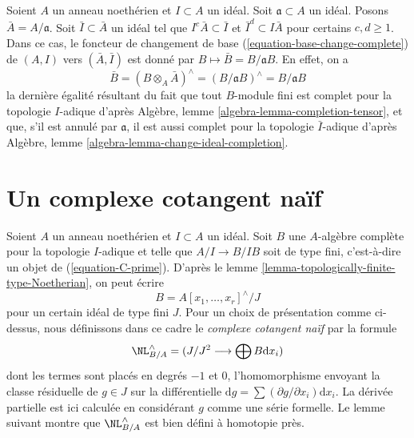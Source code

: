 \begin{remark}
\label{remark-take-bar}
Soient $A$ un anneau noethérien et $I \subset A$ un idéal. Soit
$\mathfrak a \subset A$ un idéal. Posons $\bar A = A/\mathfrak a$. Soit
$\bar I \subset \bar A$ un idéal tel que $I^c \bar A \subset \bar I$ et
$\bar I^d \subset I\bar A$ pour certains $c, d \geq 1$. Dans ce cas, le
foncteur de changement de base (\ref{equation-base-change-complete}) de
$(A, I)$ vers $(\bar A, \bar I)$ est donné par
$B \mapsto \bar B = B/\mathfrak aB$. En effet, on a
\begin{equation}
\label{equation-base-change-to-closed}
\bar B = (B \otimes_A \bar A)^\wedge = (B/\mathfrak a B)^\wedge =
B/\mathfrak a B
\end{equation}
la dernière égalité résultant du fait que tout $B$-module fini est complet
pour la topologie $I$-adique d'après Algèbre, lemme
\ref{algebra-lemma-completion-tensor}, et que, s'il est annulé par
$\mathfrak a$, il est aussi complet pour la topologie $\bar I$-adique d'après
Algèbre, lemme \ref{algebra-lemma-change-ideal-completion}.
\end{remark}







\section{Un complexe cotangent naïf}
\label{section-naive-cotangent-complex}

\noindent
Soient $A$ un anneau noethérien et $I \subset A$ un idéal. Soit $B$ une
$A$-algèbre complète pour la topologie $I$-adique et telle que
$A/I \to B/IB$ soit de type fini, c'est-à-dire un objet de
(\ref{equation-C-prime}). D'après le lemme
\ref{lemma-topologically-finite-type-Noetherian}, on peut écrire
$$
B = A[x_1, \ldots, x_r]^\wedge / J
$$
pour un certain idéal de type fini $J$. Pour un choix de présentation comme
ci-dessus, nous définissons dans ce cadre le {\it complexe cotangent naïf} par
la formule
\begin{equation}
\label{equation-NL}
\NL_{B/A}^\wedge = (J/J^2 \longrightarrow \bigoplus B\text{d}x_i)
\end{equation}
dont les termes sont placés en degrés $-1$ et $0$, l'homomorphisme envoyant
la classe résiduelle de $g \in J$ sur la différentielle
$\text{d}g = \sum (\partial g/\partial x_i) \text{d}x_i$. La dérivée
partielle est ici calculée en considérant $g$ comme une série formelle. Le
lemme suivant montre que $\NL_{B/A}^\wedge$ est bien défini à homotopie près.

